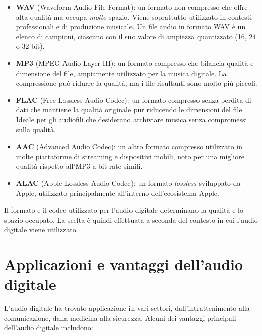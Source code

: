 \documentclass{book}
\begin{document}
\begin{itemize}
\item \textbf{WAV} (Waveform Audio File Format): un formato non compresso che offre alta qualità ma occupa \emph{molto} spazio. Viene soprattutto utilizzato in contesti professionali e di produzione musicale. Un file audio in formato WAV è un elenco di campioni, ciascuno con il suo valore di ampiezza quantizzato (16, 24 o 32 bit).
\item \textbf{MP3} (MPEG Audio Layer III): un formato compresso che bilancia qualità e dimensione del file, ampiamente utilizzato per la musica digitale. La compressione può ridurre la qualità, ma i file risultanti sono molto più piccoli.
\item \textbf{FLAC} (Free Lossless Audio Codec): un formato compresso senza perdita di dati che mantiene la qualità originale pur riducendo le dimensioni del file. Ideale per gli audiofili che desiderano archiviare musica senza compromessi sulla qualità.
\item \textbf{AAC} (Advanced Audio Codec): un altro formato compresso utilizzato in molte piattaforme di streaming e dispositivi mobili, noto per una migliore qualità rispetto all’MP3 a bit rate simili.
\item \textbf{ALAC} (Apple Lossless Audio Codec): un formato \emph{lossless} sviluppato da Apple, utilizzato principalmente all’interno dell’ecosistema Apple.
\end{itemize}

Il formato e il codec utilizzato per l’audio digitale determinano la qualità e lo spazio occupato. La scelta è quindi effettuata a seconda del contesto in cui l’audio digitale viene utilizzato.

\section{Applicazioni e vantaggi dell’audio digitale}

L’audio digitale ha trovato applicazione in vari settori, dall’intrattenimento alla comunicazione, dalla medicina alla sicurezza. Alcuni dei vantaggi principali dell’audio digitale includono:
\end{document}
